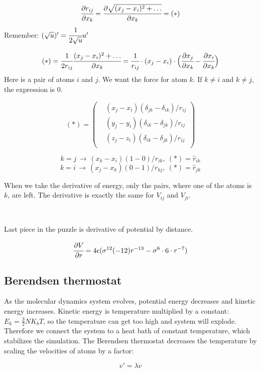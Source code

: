 \documentclass[12pt,a4paper]{article}
\newcommand{\infers}{\,\to\,}
\newcommand{\mat}[1]{\overline{#1}}
\newcommand{\framed}[1]{\tikz[baseline=(char.base)]{\node[shape=rectangle,draw,inner sep=4pt] (char) {#1};}}
\begin{document}
\[ \cfrac{\partial r_{ij}}{\partial x_k} = \cfrac{\partial \sqrt{(x_j-x_i)^2 + \ldots}}{\partial x_k} = (*) \]
Remember: \( (\sqrt{u})' = \cfrac{1}{2\sqrt{u}} u' \)

\[
(*) = \cfrac{1}{2r_{ij}} \cfrac{(x_j-x_i)^2+\ldots}{\partial x_k} = \cfrac{1}{r_{ij}} \cdot (x_j-x_i) \cdot \Bigl(\cfrac{\partial x_j}{\partial x_k} - \cfrac{\partial x_i}{\partial x_k}\Bigr)
\]
Here is a pair of atoms $i$ and $j$. We want the force for atom $k$. If \(k\neq i\) and \(k\neq j\), the expression is 0.

\[
(*) = \left( \begin{aligned}
	& (x_j - x_i) (\delta_{jk} - \delta_{ik}) / r_{ij} \\
	& (y_j - y_i) (\delta_{ik} - \delta_{jk}) / r_{ij} \\
	& (z_j - z_i) (\delta_{ik} - \delta_{jk}) / r_{ij} \\
\end{aligned} \right) 
\]

\[
k=j \infers (x_k-x_i)(1-0)/r_{ik},\ (*) = {\hat r_{ik}}
\]
\[
k=i \infers (x_j-x_k)(0-1)/r_{kj},\ (*) = {\hat r_{jk}}
\]

When we take the derivative of energy, only the pairs, where one of the atoms is \(k\), are left. The derivative is exactly the same for \(V_{ij}\) and \(V_{ji}\).

{\centering\framed{ \( \mat{f}_k = - \sum_i \cfrac{\partial V}{\partial r} {\hat r_{ik}} \) }\\}

Last piece in the puzzle is derivative of potential by distance.

\[
\cfrac{\partial V}{\partial r} = 4\epsilon (\sigma^{12} (-12) r^{-13} - \sigma^6\cdot 6\cdot r^{-7})
\]

\subsection*{Berendsen thermostat}

As the molecular dynamics system evolves, potential energy decreases and kinetic energy increases. Kinetic energy is temperature multiplied by a constant: $E_k = \frac{3}{2} NK_b T$, so the temperature can get too high and system will explode. Therefore we connect the system to a heat bath of constant temperature, which stabilizes the simulation. The Berendsen thermostat \cite{berendsen} decreases the temperature by scaling the velocities of atoms by a factor:

\[ v' = \lambda v \]
\end{document}
